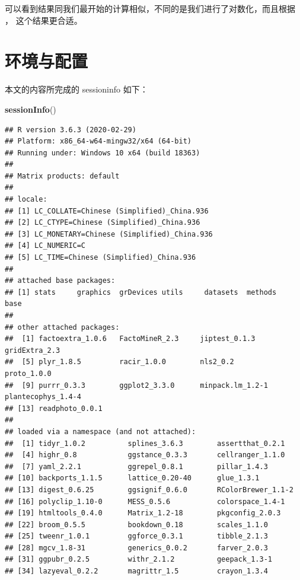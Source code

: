 \documentclass[
]{krantz}
\makeatletter
\newenvironment{Shaded}{\begin{snugshade}}{\end{snugshade}}
\newcommand{\KeywordTok}[1]{\textcolor[rgb]{0.13,0.29,0.53}{\textbf{#1}}}
\newcommand{\NormalTok}[1]{#1}
\newenvironment{kframe}{%
\medskip{}
\setlength{\fboxsep}{.8em}
 \def\at@end@of@kframe{}%
 \ifinner\ifhmode%
  \def\at@end@of@kframe{\end{minipage}}%
  \begin{minipage}{\columnwidth}%
 \fi\fi%
 \def\FrameCommand##1{\hskip\@totalleftmargin \hskip-\fboxsep
 \colorbox{shadecolor}{##1}\hskip-\fboxsep
     \hskip-\linewidth \hskip-\@totalleftmargin \hskip\columnwidth}%
 \MakeFramed {\advance\hsize-\width
   \@totalleftmargin\z@ \linewidth\hsize
   \@setminipage}}%
 {\par\unskip\endMakeFramed%
 \at@end@of@kframe}
\renewenvironment{Shaded}{\begin{kframe}}{\end{kframe}}
\makeatother
\begin{document}
可以看到结果同我们最开始的计算相似，不同的是我们进行了对数化，而且根据 \citet{kemp2003modern}， 这个结果更合适。

\hypertarget{sessioninfo}{%
\chapter{环境与配置}\label{sessioninfo}}

本文的内容所完成的 sessioninfo 如下：

\begin{Shaded}
\begin{Highlighting}[]
\KeywordTok{sessionInfo}\NormalTok{()}
\end{Highlighting}
\end{Shaded}

\begin{verbatim}
## R version 3.6.3 (2020-02-29)
## Platform: x86_64-w64-mingw32/x64 (64-bit)
## Running under: Windows 10 x64 (build 18363)
## 
## Matrix products: default
## 
## locale:
## [1] LC_COLLATE=Chinese (Simplified)_China.936 
## [2] LC_CTYPE=Chinese (Simplified)_China.936   
## [3] LC_MONETARY=Chinese (Simplified)_China.936
## [4] LC_NUMERIC=C                              
## [5] LC_TIME=Chinese (Simplified)_China.936    
## 
## attached base packages:
## [1] stats     graphics  grDevices utils     datasets  methods   base     
## 
## other attached packages:
##  [1] factoextra_1.0.6   FactoMineR_2.3     jiptest_0.1.3      gridExtra_2.3     
##  [5] plyr_1.8.5         racir_1.0.0        nls2_0.2           proto_1.0.0       
##  [9] purrr_0.3.3        ggplot2_3.3.0      minpack.lm_1.2-1   plantecophys_1.4-4
## [13] readphoto_0.0.1   
## 
## loaded via a namespace (and not attached):
##  [1] tidyr_1.0.2          splines_3.6.3        assertthat_0.2.1    
##  [4] highr_0.8            ggstance_0.3.3       cellranger_1.1.0    
##  [7] yaml_2.2.1           ggrepel_0.8.1        pillar_1.4.3        
## [10] backports_1.1.5      lattice_0.20-40      glue_1.3.1          
## [13] digest_0.6.25        ggsignif_0.6.0       RColorBrewer_1.1-2  
## [16] polyclip_1.10-0      MESS_0.5.6           colorspace_1.4-1    
## [19] htmltools_0.4.0      Matrix_1.2-18        pkgconfig_2.0.3     
## [22] broom_0.5.5          bookdown_0.18        scales_1.1.0        
## [25] tweenr_1.0.1         ggforce_0.3.1        tibble_2.1.3        
## [28] mgcv_1.8-31          generics_0.0.2       farver_2.0.3        
## [31] ggpubr_0.2.5         withr_2.1.2          geepack_1.3-1       
## [34] lazyeval_0.2.2       magrittr_1.5         crayon_1.3.4        

\end{verbatim}
\end{document}
